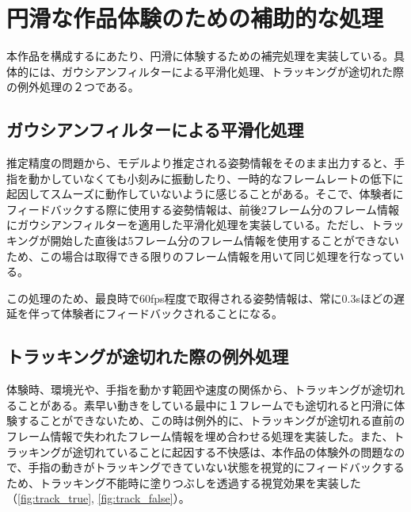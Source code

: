 \section{円滑な作品体験のための補助的な処理}
本作品を構成するにあたり、円滑に体験するための補完処理を実装している。具体的には、ガウシアンフィルターによる平滑化処理、トラッキングが途切れた際の例外処理の２つである。

\subsection{ガウシアンフィルターによる平滑化処理}
推定精度の問題から、モデルより推定される姿勢情報をそのまま出力すると、手指を動かしていなくても小刻みに振動したり、一時的なフレームレートの低下に起因してスムーズに動作していないように感じることがある。そこで、体験者にフィードバックする際に使用する姿勢情報は、前後2フレーム分のフレーム情報にガウシアンフィルターを適用した平滑化処理を実装している。ただし、トラッキングが開始した直後は5フレーム分のフレーム情報を使用することができないため、この場合は取得できる限りのフレーム情報を用いて同じ処理を行なっている。


この処理のため、最良時で60fps程度で取得される姿勢情報は、常に0.3sほどの遅延を伴って体験者にフィードバックされることになる。

\subsection{トラッキングが途切れた際の例外処理}
体験時、環境光や、手指を動かす範囲や速度の関係から、トラッキングが途切れることがある。素早い動きをしている最中に１フレームでも途切れると円滑に体験することができないため、この時は例外的に、トラッキングが途切れる直前のフレーム情報で失われたフレーム情報を埋め合わせる処理を実装した。また、トラッキングが途切れていることに起因する不快感は、本作品の体験外の問題なので、手指の動きがトラッキングできていない状態を視覚的にフィードバックするため、トラッキング不能時に塗りつぶしを透過する視覚効果を実装した（\ref{fig:track_true}, \ref{fig:track_false}）。

